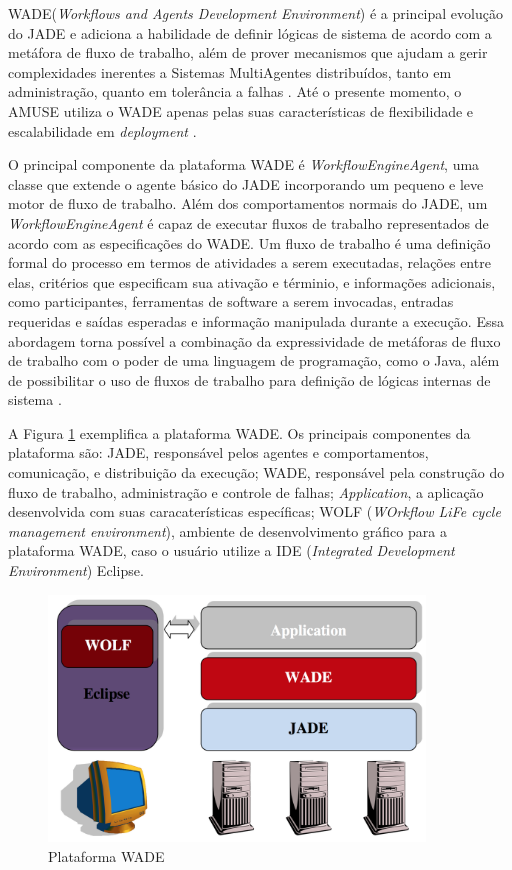 WADE(\textit{Workflows and Agents Development Environment}) é a principal evolução do JADE e adiciona a habilidade de definir lógicas de sistema de acordo com a metáfora de fluxo de trabalho, além de prover mecanismos que ajudam a gerir complexidades inerentes a Sistemas MultiAgentes distribuídos, tanto em administração, quanto em tolerância a falhas \cite{wade2009}.
Até o presente momento, o AMUSE utiliza o WADE apenas pelas suas características de flexibilidade e escalabilidade em \textit{deployment} \cite{bergenti2015}.

O principal componente da plataforma WADE é \textit{WorkflowEngineAgent}, uma classe que extende o agente básico do JADE incorporando um pequeno e leve motor de fluxo de trabalho. Além dos comportamentos normais do JADE, um \textit{WorkflowEngineAgent} é capaz de executar fluxos de trabalho representados de acordo com as especificações do WADE. Um fluxo de trabalho é uma definição formal do processo em termos de atividades a serem executadas, relações entre elas, critérios que especificam sua ativação e términio, e informações adicionais, como participantes, ferramentas de software a serem invocadas, entradas requeridas e saídas esperadas e informação manipulada durante a execução. Essa abordagem torna possível a combinação da expressividade de metáforas de fluxo de trabalho com o poder de uma linguagem de programação, como o Java, além de possibilitar o uso de fluxos de trabalho para definição de lógicas internas de sistema \cite{wade}.

A Figura \ref{figura:wade} exemplifica a plataforma WADE. Os principais componentes da plataforma são: JADE, responsável pelos agentes e comportamentos, comunicação, e distribuição da execução; WADE, responsável pela construção do fluxo de trabalho, administração e controle de falhas; \textit{Application}, a aplicação desenvolvida com suas caracaterísticas específicas; WOLF (\textit{WOrkflow LiFe cycle management environment}), ambiente de desenvolvimento gráfico para a plataforma WADE, caso o usuário utilize a IDE (\textit{Integrated Development Environment}) Eclipse.

\begin{figure}[h]
  \centering
  \includegraphics[width=10cm]{figuras/wade}
  \caption{Plataforma WADE \cite{wadeUserGuide}}
  \label{figura:wade}
\end{figure}

